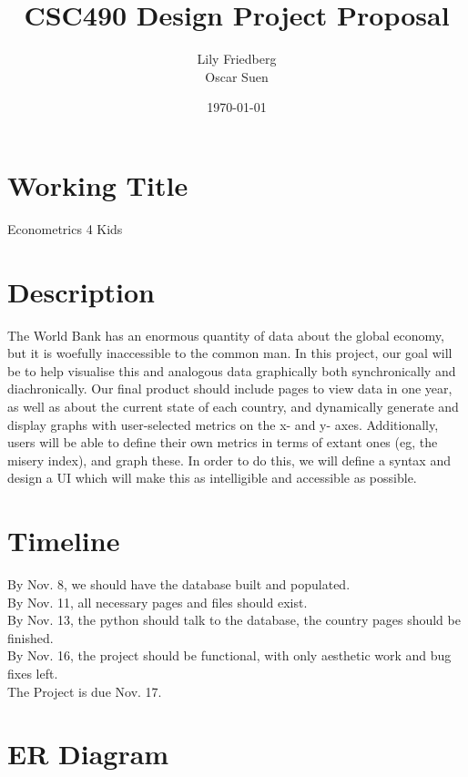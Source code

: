 \documentclass[12pt]{article}
\title{CSC490 Design Project Proposal}
\author{Lily Friedberg \\ Oscar Suen}
\date{\today}
\begin{document}
\maketitle

\section{Working Title}
Econometrics 4 Kids
\section{Description}
The World Bank has an enormous quantity of data about the global economy, but it is woefully inaccessible to the common man. In this project, our goal will be to help visualise this and analogous data graphically both synchronically and diachronically. Our final product should include pages to view data in one year, as well as about the current state of each country, and dynamically generate and display graphs with user-selected metrics on the x- and y- axes. Additionally, users will be able to define their own metrics in terms of extant ones (eg, the misery index), and graph these. In order to do this, we will define a syntax and design a UI which will make this as intelligible and accessible as possible.
\section{Timeline}
By Nov. 8, we should have the database built and populated. \\
By Nov. 11, all necessary pages and files should exist. \\
By Nov. 13, the python should talk to the database, the country pages should be finished. \\
By Nov. 16, the project should be functional, with only aesthetic work and bug fixes left. \\
The Project is due Nov. 17.
\section{ER Diagram}
\end{document}
